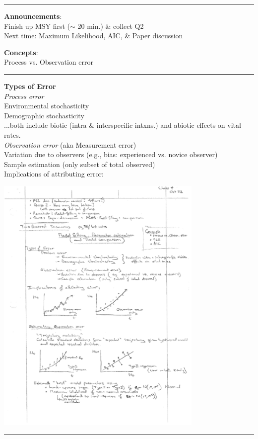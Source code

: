 \documentclass{article}
\newcommand{\ind}{\-\hspace{1cm}}
\begin{document}
\noindent{}

\rule[0.5ex]{\linewidth}{1pt}
\textbf{Announcements}:\\
Finish up MSY first ($\sim$ 20 min.) \& collect Q2\\
Next time: Maximum Likelihood, AIC, \& Paper discussion

\textbf{Concepts}: \\
Process vs. Observation error

\rule[0.5ex]{\linewidth}{1pt}
\textbf{Types of Error}\\
\emph{Process error}\\
\ind Environmental stochasticity\\
\ind Demographic stochasticity\\
\ind \ind ...both include biotic (intra \& interspecific intxns.) and abiotic effects on vital rates.\\
\emph{Observation error} (aka Measurement error)\\
\ind Variation due to observers (e.g., bias: experienced vs. novice observer)\\
\ind Sample estimation (only subset of total observed)\\

Implications of attributing error:
\begin{center}
\includegraphics[width=10cm]{figs/image0.pdf}
\end{center}
\rule[0.5ex]{\linewidth}{1pt}
\end{document}
